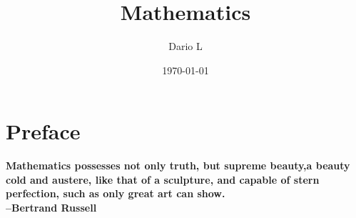 \documentclass[a4paper,11pt]{book}
\author{Dario L}
\title{Mathematics}
\date{\today}
\begin{document}
\frontmatter
\maketitle

\chapter*{Preface}
\textbf{Mathematics possesses not only truth, but supreme beauty,a beauty cold and austere, like that of a sculpture,
and capable of stern perfection, such as only great art can show.\\ --Bertrand Russell}



\tableofcontents

\mainmatter


\end{document}
